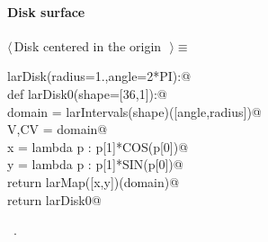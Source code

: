 \documentclass[11pt,oneside]{article}	%
\begin{document}
\paragraph{Disk surface}
\begin{flushleft} \small \label{scrap8}
$\langle\,$Disk centered in the origin\nobreak\ {\footnotesize {}}$\,\rangle\equiv$
\vspace{-1ex}
\begin{list}{}{} \item
\mbox{}\verb@def larDisk(radius=1.,angle=2*PI):@\\
\mbox{}\verb@   def larDisk0(shape=[36,1]):@\\
\mbox{}\verb@      domain = larIntervals(shape)([angle,radius])@\\
\mbox{}\verb@      V,CV = domain@\\
\mbox{}\verb@      x = lambda p : p[1]*COS(p[0])@\\
\mbox{}\verb@      y = lambda p : p[1]*SIN(p[0])@\\
\mbox{}\verb@      return larMap([x,y])(domain)@\\
\mbox{}\verb@   return larDisk0@\\
\mbox{}\verb@@{\NWsep}
\end{list}
\vspace{-1ex}
\footnotesize\addtolength{\baselineskip}{-1ex}
\begin{list}{}{\setlength{\itemsep}{-\parsep}\setlength{\itemindent}{-\leftmargin}}
\item \NWtxtMacroRefIn\ .
\end{list}
\end{flushleft}
\end{document}
